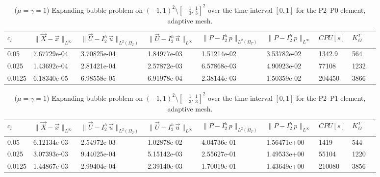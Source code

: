 \documentclass[a4paper,12pt,onecolumn]{article}
\newcommand{\errorXx}{\|\vec{X} - \vec{x}\|_{L^\infty}}
\newcommand{\LerrorUu}[1]{\|\vec U - I^h_{#1}\,\vec u\|_{L^2(\Omega_T)}}
\newcommand{\errorUu}[1]{\|\vec U - I^h_{#1}\,\vec u\|_{L^\infty}}
\newcommand{\errorPp}[1]{\|P - I^h_{#1}\,p\|_{L^\infty}}
\newcommand{\LerrorPp}[1]{\|P - I^h_{#1}\,p\|_{L^2(\Omega_T)}}
\begin{document}
\begin{table}
 \center
 \hspace*{-2cm}
\begin{tabular}{lllllllll}
\hline
$c_l$ & $\errorXx$ & $\LerrorUu2$ & $\errorUu2$ & $\LerrorPp2$ & $\errorPp2$ & $CPU[s]$ & $K_\Omega^T$\\
\hline
0.05 & 7.67729e-04 & 3.70825e-04 & 1.84977e-03 & 1.51214e-02 & 3.53782e-02 & 1342.9 & 564\\
0.025 & 1.43692e-04 & 2.81421e-04 & 2.57872e-03 & 6.57868e-03 & 4.90923e-02 & 77108 & 1232\\
0.0125 & 6.18340e-05 & 6.98558e-05 & 6.91978e-04 & 2.38144e-03 & 1.50359e-02 & 204450 & 3866\\
\hline
\end{tabular}
\hspace*{-2cm}
\caption{($\mu=\gamma=1$) Expanding bubble problem on $(-1,1)^2\setminus[-\frac{1}{3},\frac{1}{3}]^2$ over the time interval $[0,1]$ for the P2--P0 element, adaptive mesh.}
\label{tab:expandingbubble2Dp2p0adaptive}
\end{table}

\begin{table}
 \center
 \hspace*{-2cm}
\begin{tabular}{lllllllll}
\hline
$c_l$ & $\errorXx$ & $\LerrorUu2$ & $\errorUu2$ & $\LerrorPp2$ & $\errorPp2$ & $CPU[s]$ & $K_\Omega^T$\\
\hline
0.05 & 6.12134e-03 & 2.54972e-03 & 1.02878e-02 & 4.04736e-01 & 1.56471e+00 & 1419 & 544\\
0.025 & 3.07393e-03 & 9.44025e-04 & 5.15142e-03 & 2.55627e-01 & 1.49533e+00 & 55104 & 1220\\
0.0125 & 1.44867e-03 & 2.99404e-04 & 2.39140e-03 & 1.70019e-01 & 1.43649e+00 & 210080 & 3856\\
\hline
\end{tabular}
\hspace*{-2cm}
\caption{($\mu=\gamma=1$) Expanding bubble problem on $(-1,1)^2\setminus[-\frac{1}{3},\frac{1}{3}]^2$ over the time interval $[0,1]$ for the P2--P1 element, adaptive mesh.}
\label{tab:expandingbubble2Dp2p1adaptive}
\end{table}
\end{document}
